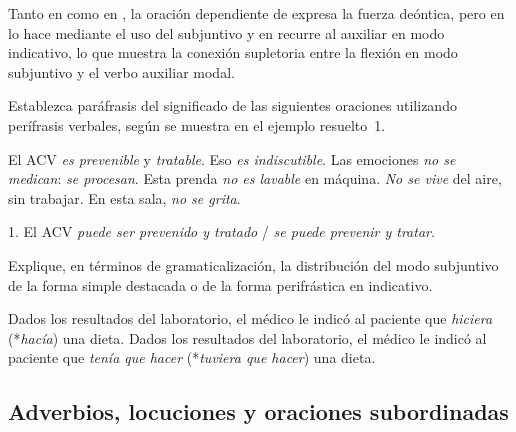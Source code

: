 Tanto en  como en , la oración
dependiente de  expresa la fuerza deóntica, pero en
 lo hace mediante el uso del subjuntivo  y
en  recurre al auxiliar  en modo indicativo, lo
que muestra la conexión supletoria entre la flexión en modo subjuntivo y el verbo
auxiliar modal.

\begin{ejercicio}\label{ej:14-parafrasis}
Establezca paráfrasis del significado de las siguientes oraciones utilizando
perífrasis verbales, según se muestra en el ejemplo resuelto~1.

\begin{exe}
  \ex El ACV \textit{es prevenible} y \textit{tratable}.
  \ex Eso \textit{es indiscutible}.
  \ex Las emociones \textit{no se medican}: \textit{se procesan}.
  \ex Esta prenda \textit{no es lavable} en máquina.
  \ex \textit{No se vive} del aire, sin trabajar.
  \ex En esta sala, \textit{no se grita}.
\end{exe}

\begin{resuelto}
1. El ACV \textit{puede ser prevenido y tratado} / \textit{se puede prevenir y
tratar}.
\end{resuelto}
\end{ejercicio}

\begin{ejercicio}\label{ej:14-gramaticalizacion}
Explique, en términos de gramaticalización, la distribución del modo subjuntivo
de la forma simple destacada o de la forma perifrástica en indicativo.

\begin{exe}
  \ex Dados los resultados del laboratorio, el médico le indicó al paciente que
      \textit{hiciera} (*\textit{hacía}) una dieta.
  \ex Dados los resultados del laboratorio, el médico le indicó al paciente que
      \textit{tenía que hacer} (*\textit{tuviera que hacer}) una
      dieta.
\end{exe}
\end{ejercicio}

\subsection{Adverbios, locuciones y oraciones subordinadas}\label{sec:14-adverbios}

